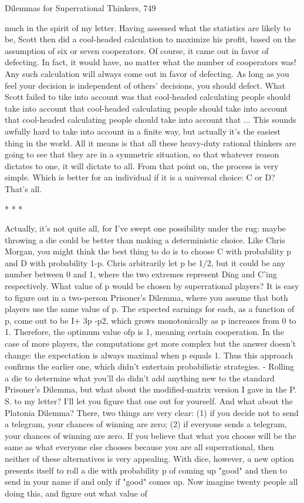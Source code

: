 Dilemmas for Superrational Thinkers,                                                 749

much in the spirit of my letter. Having assessed what the statistics are likely to be,
Scott then did a cool-headed calculation to maximize his profit, based on the
assumption of six or seven cooperators. Of course, it came out in favor of defecting.
In fact, it would have, no matter what the number of cooperators was! Any such
calculation will always come out in favor of defecting. As long as you feel your
decision is independent of others' decisions, you should defect. What Scott failed to
tike into account was that cool-headed calculating people should take into account
that cool-headed calculating people should take into account that cool-headed
calculating people should take into account that ...
        This sounds awfully hard to take into account in a finite way, but actually it's
the easiest thing in the world. All it means is that all these heavy-duty rational
thinkers are going to see that they are in a symmetric situation, so that whatever
reason dictates to one, it will dictate to all. From that point on, the process is very
simple. Which is better for an individual if it is a universal choice: C or D? That's all.

                                        *   *   *

        Actually, it's not quite all, for I've swept one possibility under the rug: maybe
throwing a die could be better than making a deterministic choice. Like Chris
Morgan, you might think the best thing to do is to choose C with probability p and D
with probability 1-p. Chris arbitrarily let p be 1/2, but it could be any number between
0 and 1, where the two extremes represent Ding and C'ing respectively. What value of
p would be chosen by superrational players? It is easy to figure out in a two-person
Prisoner's Dilemma, where you assume that both players use the same value of p. The
expected earnings for each, as a function of p, come out to be I+ 3p -p2, which grows
monotonically as p increases from 0 to 1. Therefore, the optimum value ofp is 1,
meaning certain cooperation. In the case of more players, the computations get more
complex but the answer doesn't change: the expectation is always maximal when p
equals 1. Thus this approach confirms the earlier one, which didn't entertain
probabilistic strategies. - Rolling a die to determine what you'll do didn't add anything
new to the standard Prisoner's Dilemma, but what about the modified-matrix version I
gave in the P. S. to my letter? I'll let you figure that one out for yourself. And what
about the Platonia Dilemma? There, two things are very clear: (1) if you decide not to
send a telegram, your chances of winning are zero; (2) if everyone sends a telegram,
your chances of winning are zero. If you believe that what you choose will be the
same as what everyone else chooses because you are all superrational, then neither of
these alternatives is very appealing. With dice, however, a new option presents itself
to roll a die with probability p of coming up "good" and then to send in your name if
and only if "good" comes up.
        Now imagine twenty people all doing this, and figure out what value of




